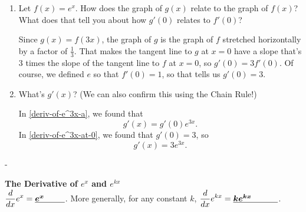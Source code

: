 \documentclass{article}
\makeatletter
\newlength{\tipmargin}
\renewenvironment{framed}{
  \setlength{\tipmargin}{\textwidth-\linewidth}
  \advance\@totalleftmargin-\tipmargin
  \def\FrameCommand{\hspace{\tipmargin}\fbox}%
  \advance\linewidth\tipmargin
  \MakeFramed {\advance\hsize-\width \FrameRestore}%
}
{\endMakeFramed}
\makeatother
\begin{document}
\begin{enumerate}[resume]
\begin{enumerate}
    \begin{solution}
      $\left( e^{3x} \right) = \left( e^3 \right)^x$. Since $g(x)$ can be written as $g(x) = b^x$, we know that $g'(x) = g'(0) b^x = g'(0) \left( e^3 \right)^x = g'(0) e^{3x}$. 
    \end{solution}

  \item \label{deriv-of-e^3x-at-0}
    \begin{problem}[\stretch{1.25}]
      Let $f(x) = e^x$. How does the graph of $g(x)$ relate to the graph of $f(x)$? What does that tell you about how $g'(0)$ relates to $f'(0)$?
    \end{problem}

    \begin{solution}
      Since $g(x) = f(3x)$, the graph of $g$ is the graph of $f$ stretched horizontally by a factor of $\frac{1}{3}$. That makes the tangent line to $g$ at $x = 0$ have a slope that's 3 times the slope of the tangent line to $f$ at $x = 0$, so $g'(0) = 3 f'(0)$. Of course, we defined $e$ so that $f'(0) = 1$, so that tells us $g'(0) = 3$.
    \end{solution}

  \item
    \begin{problem}[\newpage]
      What's $g'(x)$? (We can also confirm this using the Chain Rule!)
    \end{problem}

    \begin{solution}
      In \ref{deriv-of-e^3x-a}, we found that \[g'(x) = g'(0) e^{3x}.\] In \ref{deriv-of-e^3x-at-0}, we found that $g'(0) = 3$, so
      \[ g'(x) = 3 e^{3x}.\]
    \end{solution}

  \end{enumerate}

\end{enumerate}
\begin{framed}
 \textbf{ The Derivative of $e^{x}$ and $e^{kx}$}\\
  $\displaystyle \frac{d}{dx} e^x = \fitb{0.5in}{e^x}$.  More generally, for any
  constant $k$, $\displaystyle \frac{d}{dx} e^{kx} = \fitb{0.75in}{ke^{kx}}$.
\end{framed}
\end{document}
